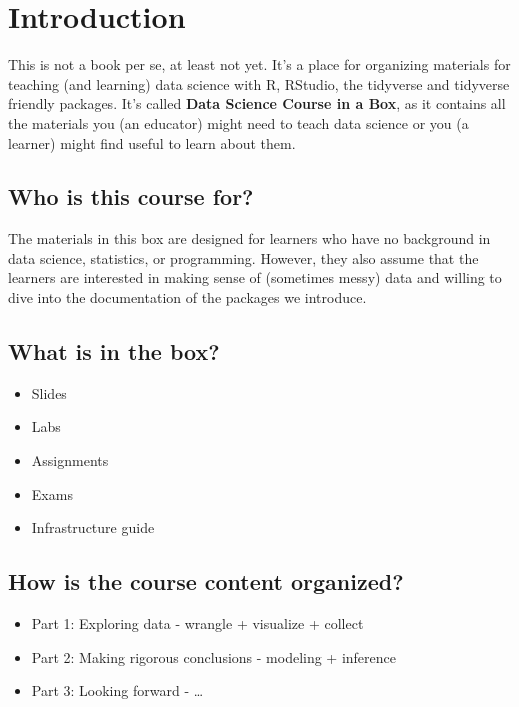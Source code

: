 \documentclass[]{article}
\title{}
\author{}
\date{}
\providecommand{\tightlist}{%
  \setlength{\itemsep}{0pt}\setlength{\parskip}{0pt}}
\begin{document}
{
\setcounter{tocdepth}{2}
\tableofcontents
}
\section{Introduction}\label{intro}

This is not a book per se, at least not yet. It's a place for organizing
materials for teaching (and learning) data science with R, RStudio, the
tidyverse and tidyverse friendly packages. It's called \textbf{Data
Science Course in a Box}, as it contains all the materials you (an
educator) might need to teach data science or you (a learner) might find
useful to learn about them.

\subsection{Who is this course for?}\label{who-is-this-course-for}

The materials in this box are designed for learners who have no
background in data science, statistics, or programming. However, they
also assume that the learners are interested in making sense of
(sometimes messy) data and willing to dive into the documentation of the
packages we introduce.

\subsection{What is in the box?}\label{what-is-in-the-box}

\begin{itemize}
\tightlist
\item
  Slides
\item
  Labs
\item
  Assignments
\item
  Exams
\item
  Infrastructure guide
\end{itemize}

\subsection{How is the course content
organized?}\label{how-is-the-course-content-organized}

\begin{itemize}
\tightlist
\item
  Part 1: Exploring data - wrangle + visualize + collect
\item
  Part 2: Making rigorous conclusions - modeling + inference
\item
  Part 3: Looking forward - \ldots{}
\end{itemize}
\end{document}
